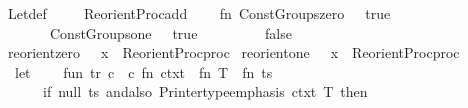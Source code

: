 \begin{isabellebody}
\ Let{\isacharunderscore}{\kern0pt}def\ \isacommand{{\isachardot}{\kern0pt}{\isachardot}{\kern0pt}}\isamarkupfalse%
%
\endisatagproof
{\isafoldproof}%
%
\isadelimproof
\isanewline
%
\endisadelimproof
%
\isadelimML
\isanewline
%
\endisadelimML
%
\isatagML
{}\isamarkupfalse%
\ {\isacartoucheopen}\isanewline
\ \ Reorient{\isacharunderscore}{\kern0pt}Proc{\isachardot}{\kern0pt}add\isanewline
\ \ \ \ {\isacharparenleft}{\kern0pt}fn\ Const{\isacharparenleft}{\kern0pt}\isactrlconstUNDERSCOREname {\isasymopen}Groups{\isachardot}{\kern0pt}zero{\isasymclose}{\isacharcomma}{\kern0pt}\ {\isacharunderscore}{\kern0pt}{\isacharparenright}{\kern0pt}\ {\isacharequal}{\kern0pt}{\isachargreater}{\kern0pt}\ true\isanewline
\ \ \ \ \ \ {\isacharbar}{\kern0pt}\ Const{\isacharparenleft}{\kern0pt}\isactrlconstUNDERSCOREname {\isasymopen}Groups{\isachardot}{\kern0pt}one{\isasymclose}{\isacharcomma}{\kern0pt}\ {\isacharunderscore}{\kern0pt}{\isacharparenright}{\kern0pt}\ {\isacharequal}{\kern0pt}{\isachargreater}{\kern0pt}\ true\isanewline
\ \ \ \ \ \ {\isacharbar}{\kern0pt}\ {\isacharunderscore}{\kern0pt}\ {\isacharequal}{\kern0pt}{\isachargreater}{\kern0pt}\ false{\isacharparenright}{\kern0pt}\isanewline
{\isacartoucheclose}\isanewline
\isanewline
{}\isamarkupfalse%
\ reorient{\isacharunderscore}{\kern0pt}zero\ {\isacharparenleft}{\kern0pt}{\isachardoublequoteopen}{}\ {\isacharequal}{\kern0pt}\ x{\isachardoublequoteclose}{\isacharparenright}{\kern0pt}\ {\isacharequal}{\kern0pt}\ Reorient{\isacharunderscore}{\kern0pt}Proc{\isachardot}{\kern0pt}proc\isanewline
{}\isamarkupfalse%
\ reorient{\isacharunderscore}{\kern0pt}one\ {\isacharparenleft}{\kern0pt}{\isachardoublequoteopen}{}\ {\isacharequal}{\kern0pt}\ x{\isachardoublequoteclose}{\isacharparenright}{\kern0pt}\ {\isacharequal}{\kern0pt}\ Reorient{\isacharunderscore}{\kern0pt}Proc{\isachardot}{\kern0pt}proc\isanewline
\isanewline
{}\isamarkupfalse%
\ {\isacartoucheopen}\isanewline
\ \ let\isanewline
\ \ \ \ fun\ tr{\isacharprime}{\kern0pt}\ c\ {\isacharequal}{\kern0pt}\ {\isacharparenleft}{\kern0pt}c{\isacharcomma}{\kern0pt}\ fn\ ctxt\ {\isacharequal}{\kern0pt}{\isachargreater}{\kern0pt}\ fn\ T\ {\isacharequal}{\kern0pt}{\isachargreater}{\kern0pt}\ fn\ ts\ {\isacharequal}{\kern0pt}{\isachargreater}{\kern0pt}\isanewline
\ \ \ \ \ \ if\ null\ ts\ andalso\ Printer{\isachardot}{\kern0pt}type{\isacharunderscore}{\kern0pt}emphasis\ ctxt\ T\ then\isanewline

\end{isabellebody}
